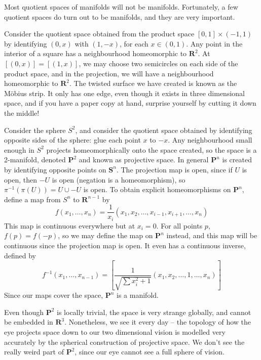 Most quotient spaces of manifolds will not be manifolds. Fortunately, a few quotient spaces do turn out to be manifolds, and they are very important.

\begin{example}
    Consider the quotient space obtained from the product space $[0,1] \times (-1,1)$ by identifying $(0,x)$ with $(1,-x)$, for each $x \in (0,1)$. Any point in the interior of a square has a neighbourhood homeomorphic to $\mathbf{R}^2$. At $[(0,x)] = [(1,x)]$, we may choose two semicircles on each side of the product space, and in the projection, we will have a neighbourhood homeomorphic to $\mathbf{R}^2$. The twisted surface we have created is known as the M\"{o}bius strip. It only has one edge, even though it exists in three dimensional space, and if you have a paper copy at hand, surprise yourself by cutting it down the middle!
\end{example}

\begin{example}
    Consider the sphere $S^2$, and consider the quotient space obtained by identifying opposite sides of the sphere: glue each point $x$ to $-x$. Any neighbourhood small enough in $S^2$ projects homeomorphically onto the space created, so the space is a 2-manifold, denoted $\mathbf{P}^2$ and known as projective space. In general $\mathbf{P}^n$ is created by identifying opposite points on $\mathbf{S}^n$. The projection map is open, since if $U$ is open, then $-U$ is open (negation is a homeomorphism), so $\pi^{-1}(\pi(U)) = U \cup -U$ is open. To obtain explicit homeomorphisms on $\mathbf{P}^n$, define a map from $S^n$ to $\mathbf{R}^{n-1}$ by
    \[ f(x_1, \dots, x_n) = \frac{1}{x_i}(x_1, x_2, \dots, x_{i-1}, x_{i + 1}, \dots, x_n) \]
    This map is continuous everywhere but at $x_i = 0$. For all points $p$, $f(p) = f(-p)$, so we may define the map on $\mathbf{P}^n$ instead, and this map will be continuous since the projection map is open. It even has a continuous inverse, defined by
    \[ f^{-1}(x_1, \dots, x_{n-1}) = \left[ \frac{1}{\sqrt{\sum x_i^2 + 1}} \left(x_1, x_2, \dots, 1, \dots, x_n \right) \right] \]
    Since our maps cover the space, $\mathbf{P}^n$ is a manifold.
\end{example}

Even though $\mathbf{P}^2$ is locally trivial, the space is very strange globally, and cannot be embedded in $\mathbf{R}^3$. Nonetheless, we see it every day -- the topology of how the eye projects space down to our two dimensional vision is modelled very accurately by the spherical construction of projective space. We don't see the really weird part of $\mathbf{P}^2$, since our eye cannot see a full sphere of vision.

